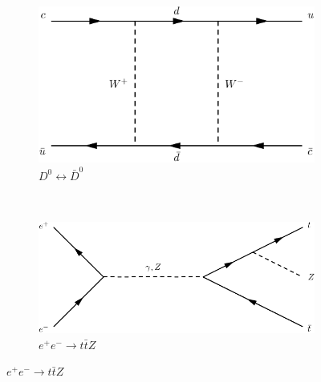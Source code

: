 \begin{figure}[h]
  \centering
  \begin{subfigure}[b]{0.3\textwidth}
    \includegraphics[width=\textwidth]{../dia/19.pdf}
    \caption{$D^0\longleftrightarrow \bar{D}^0$}
    \label{fey:19}
  \end{subfigure}
  ~
  \begin{subfigure}[b]{0.3\textwidth}
    \includegraphics[width=\textwidth]{../dia/20.pdf}
    \caption{$e^+e^- \rightarrow t\bar{t}Z$}
    \label{fey:20}
  \end{subfigure}
\end{figure}
\restoregeometry
